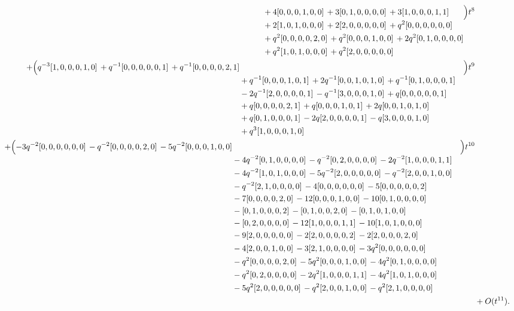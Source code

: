 \documentclass[10pt]{article}
\begin{document}
\[\begin{aligned}
\begin{aligned}[t]
  &{}+4[0,0,0,1,0,0]\,+3[0,1,0,0,0,0]\,+3[1,0,0,0,1,1] \\
  &{}+2[1,0,1,0,0,0]\,+2[2,0,0,0,0,0]\,+q^{2}[0,0,0,0,0,0] \\
  &{}+q^{2}[0,0,0,0,2,0]\,+q^{2}[0,0,0,1,0,0]\,+2q^{2}[0,1,0,0,0,0] \\
  &{}+q^{2}[1,0,1,0,0,0]\,+q^{2}[2,0,0,0,0,0]\end{aligned}\Bigr)t^{8} \\
  + \Bigl(\begin{aligned}[t]q^{-3}[1,0,0,0,1,0]\,+q^{-1}[0,0,0,0,0,1]\,+q^{-1}[0,0,0,0,2,1] \\
  &{}+q^{-1}[0,0,0,1,0,1]\,+2q^{-1}[0,0,1,0,1,0]\,+q^{-1}[0,1,0,0,0,1] \\
  &{}-2q^{-1}[2,0,0,0,0,1]\,-q^{-1}[3,0,0,0,1,0]\,+q[0,0,0,0,0,1] \\
  &{}+q[0,0,0,0,2,1]\,+q[0,0,0,1,0,1]\,+2q[0,0,1,0,1,0] \\
  &{}+q[0,1,0,0,0,1]\,-2q[2,0,0,0,0,1]\,-q[3,0,0,0,1,0] \\
  &{}+q^{3}[1,0,0,0,1,0]\end{aligned}\Bigr)t^{9} \\
  + \Bigl(\begin{aligned}[t]-3q^{-2}[0,0,0,0,0,0]\,-q^{-2}[0,0,0,0,2,0]\,-5q^{-2}[0,0,0,1,0,0] \\
  &{}-4q^{-2}[0,1,0,0,0,0]\,-q^{-2}[0,2,0,0,0,0]\,-2q^{-2}[1,0,0,0,1,1] \\
  &{}-4q^{-2}[1,0,1,0,0,0]\,-5q^{-2}[2,0,0,0,0,0]\,-q^{-2}[2,0,0,1,0,0] \\
  &{}-q^{-2}[2,1,0,0,0,0]\,-4[0,0,0,0,0,0]\,-5[0,0,0,0,0,2] \\
  &{}-7[0,0,0,0,2,0]\,-12[0,0,0,1,0,0]\,-10[0,1,0,0,0,0] \\
  &{}-[0,1,0,0,0,2]\,-[0,1,0,0,2,0]\,-[0,1,0,1,0,0] \\
  &{}-[0,2,0,0,0,0]\,-12[1,0,0,0,1,1]\,-10[1,0,1,0,0,0] \\
  &{}-9[2,0,0,0,0,0]\,-2[2,0,0,0,0,2]\,-2[2,0,0,0,2,0] \\
  &{}-4[2,0,0,1,0,0]\,-3[2,1,0,0,0,0]\,-3q^{2}[0,0,0,0,0,0] \\
  &{}-q^{2}[0,0,0,0,2,0]\,-5q^{2}[0,0,0,1,0,0]\,-4q^{2}[0,1,0,0,0,0] \\
  &{}-q^{2}[0,2,0,0,0,0]\,-2q^{2}[1,0,0,0,1,1]\,-4q^{2}[1,0,1,0,0,0] \\
  &{}-5q^{2}[2,0,0,0,0,0]\,-q^{2}[2,0,0,1,0,0]\,-q^{2}[2,1,0,0,0,0]\end{aligned}\Bigr)t^{10} \\
  &+ O(t^{11}).
\end{aligned}
\]
\end{document}
